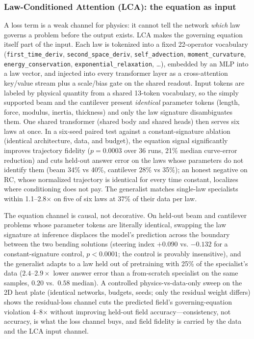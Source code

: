 \documentclass[conference,10pt]{IEEEtran}
\begin{document}
\subsubsection{Law-Conditioned Attention (LCA): the equation as input}
A loss term is a weak channel for physics: it cannot tell the network
\emph{which} law governs a problem before the output exists. LCA makes the
governing equation itself part of the input. Each law is tokenized into a
fixed 22-operator vocabulary (\texttt{first\_time\_deriv},
\texttt{second\_space\_deriv}, \texttt{self\_advection},
\texttt{moment\_curvature}, \texttt{energy\_conservation},
\texttt{exponential\_relaxation}, \ldots), embedded by an MLP into a law
vector, and injected into every transformer layer as a cross-attention
key/value stream plus a scale/bias gate on the shared readout. Input tokens
are labeled by physical quantity from a shared 13-token vocabulary, so the
simply supported beam and the cantilever present \emph{identical} parameter
tokens (length, force, modulus, inertia, thickness) and only the law
signature disambiguates them. One shared transformer (shared body and shared
heads) then serves six laws at once. In a six-seed paired test against a
constant-signature ablation (identical architecture, data, and budget), the
equation signal significantly improves trajectory fidelity ($p=0.0003$ over
36 runs, 21\% median curve-error reduction) and cuts held-out answer error
on the laws whose parameters do not identify them (beam 34\% vs 40\%,
cantilever 28\% vs 35\%); an honest negative on RC, whose normalized
trajectory is identical for every time constant, localizes where
conditioning does not pay. The generalist matches single-law specialists
within 1.1--2.8$\times$ on five of six laws at 37\% of their data per law.

The equation channel is causal, not decorative. On held-out beam and
cantilever problems whose parameter tokens are literally identical, swapping
the law signature at inference displaces the model's prediction across the
boundary between the two bending solutions (steering index $+0.090$ vs.
$-0.132$ for a constant-signature control, $p<0.0001$; the control is
provably insensitive), and the generalist adapts to a law held out of
pretraining with 25\% of the specialist's data ($2.4$--$2.9\times$ lower
answer error than a from-scratch specialist on the same samples, $0.20$
vs.\ $0.58$ median). A controlled physics-vs-data-only sweep on the 2D
heat plate (identical networks, budgets, seeds; only the residual weight
differs) shows the residual-loss channel cuts the predicted field's
governing-equation violation 4--8$\times$ without improving held-out field
accuracy---consistency, not accuracy, is what the loss channel buys, and
field fidelity is carried by the data and the LCA input channel.
\end{document}
